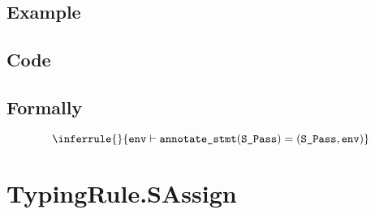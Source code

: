 \documentclass{book}
\newcommand\annotatestmt[1]{\texttt{annotate\_stmt}(#1)}
\newcommand\tenv[0]{\texttt{env}}
\begin{document}
    \subsection{Example}

    \subsection{Code}

\begin{emptyformal}
    \subsection{Formally}
\[
  \inferrule{}{\tenv \entails \annotatestmt{\texttt{S\_Pass}} = (\texttt{S\_Pass},\tenv)}
\]
\end{emptyformal}


\section{TypingRule.SAssign \label{sec:TypingRule.SAssign}}
\end{document}
